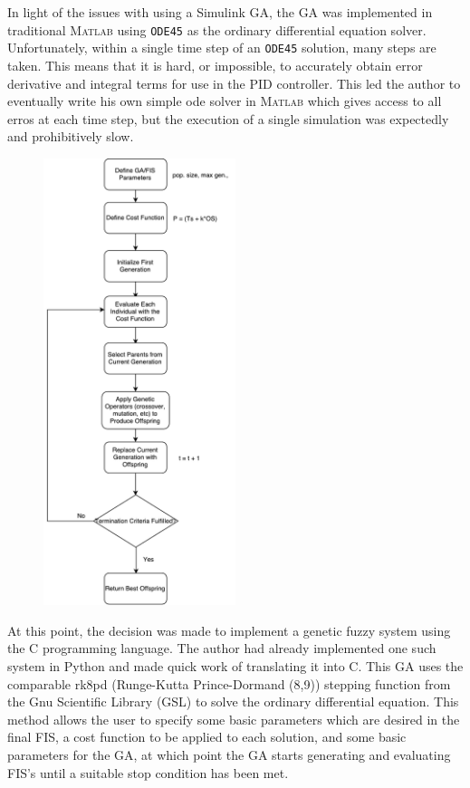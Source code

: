 \documentclass[12pt]{article}
\begin{document}
In light of the issues with using a Simulink GA, the GA was implemented in traditional \textsc{Matlab} using \verb|ODE45| as the ordinary differential equation solver. Unfortunately, within a single time step of an \verb|ODE45| solution, many steps are taken. This means that it is hard, or impossible, to accurately obtain error derivative and integral terms for use in the PID controller. This led the author to eventually write his own simple ode solver in \textsc{Matlab} which gives access to all erros at each time step, but the execution of a single simulation was expectedly and prohibitively slow.

\begin{figure}[h]
	\centering
	\includegraphics[width=0.5\textwidth]{GA.pdf}
\end{figure}

At this point, the decision was made to implement a genetic fuzzy system using  the C programming language. The author had already implemented one such system in Python and made quick work of translating it into C. This GA uses the comparable rk8pd (Runge-Kutta Prince-Dormand (8,9)) stepping function from the Gnu Scientific Library (GSL) to solve the ordinary differential equation. This method allows the user to specify some basic parameters which are desired in the final FIS, a cost function to be applied to each solution, and some basic parameters for the GA, at which point the GA starts generating and evaluating FIS's until a suitable stop condition has been met.
\end{document}

